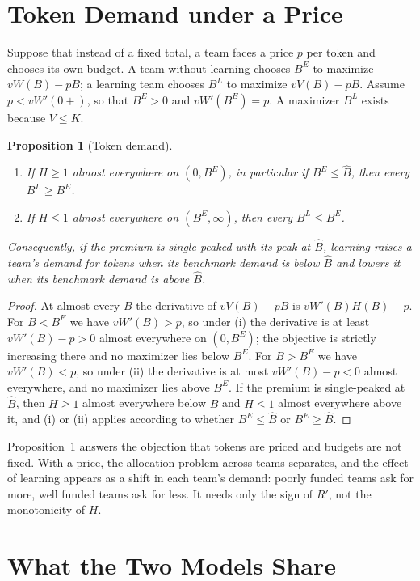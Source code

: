\documentclass[11pt]{article}
\newtheorem{proposition}{Proposition}
\theoremstyle{definition}
\begin{document}
\section{Token Demand under a Price}

Suppose that instead of a fixed total, a team faces a price $p$ per token and chooses its own budget. A team without learning chooses $B^E$ to maximize $vW(B)-pB$; a learning team chooses $B^L$ to maximize $vV(B)-pB$. Assume $p<vW'(0+)$, so that $B^E>0$ and $vW'(B^E)=p$. A maximizer $B^L$ exists because $V\le K$.

\begin{proposition}[Token demand]\label{prop:demand}
\begin{enumerate}
\item[(i)] If $H\ge1$ almost everywhere on $(0,B^E)$, in particular if $B^E\le\hat B$, then every $B^L\ge B^E$.
\item[(ii)] If $H\le1$ almost everywhere on $(B^E,\infty)$, then every $B^L\le B^E$.
\end{enumerate}
Consequently, if the premium is single-peaked with its peak at $\hat B$, learning raises a team's demand for tokens when its benchmark demand is below $\hat B$ and lowers it when its benchmark demand is above $\hat B$.
\end{proposition}

\begin{proof}
At almost every $B$ the derivative of $vV(B)-pB$ is $vW'(B)H(B)-p$. For $B<B^E$ we have $vW'(B)>p$, so under (i) the derivative is at least $vW'(B)-p>0$ almost everywhere on $(0,B^E)$; the objective is strictly increasing there and no maximizer lies below $B^E$. For $B>B^E$ we have $vW'(B)<p$, so under (ii) the derivative is at most $vW'(B)-p<0$ almost everywhere, and no maximizer lies above $B^E$. If the premium is single-peaked at $\hat B$, then $H\ge1$ almost everywhere below $\hat B$ and $H\le1$ almost everywhere above it, and (i) or (ii) applies according to whether $B^E\le\hat B$ or $B^E\ge\hat B$.
\end{proof}

Proposition~\ref{prop:demand} answers the objection that tokens are priced and budgets are not fixed. With a price, the allocation problem across teams separates, and the effect of learning appears as a shift in each team's demand: poorly funded teams ask for more, well funded teams ask for less. It needs only the sign of $R'$, not the monotonicity of $H$.

\section{What the Two Models Share}\label{sec:shared}
\end{document}
